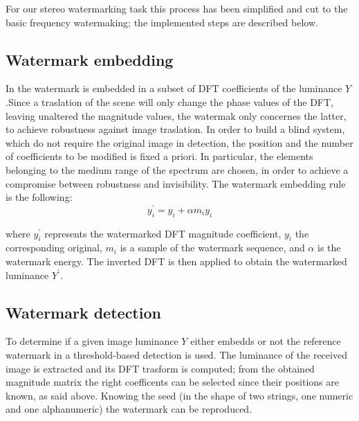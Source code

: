 For our stereo watermarking task this process has been simplified and cut to the basic frequency watermaking; the implemented steps are described below.

\subsection{Watermark embedding} 
\label{wat_emb}

In \cite{PIVA} the watermark is embedded in a subset of DFT coefficients of the luminance $Y$.\newline Since a traslation of the scene will only change the phase values of the DFT, leaving unaltered the magnitude values, the watermak only concernes the latter, to achieve robustness against image traslation.\newline
In order to build a blind system, which do not require the original image in detection, the position and the number of coefficients to be modified is fixed a priori. In particular, the elements belonging to the medium range of the
spectrum are chosen, in order to achieve a compromise between robustness and invisibility.
The watermark embedding rule is the following:
\begin{equation}\label{eq:wat}
y_{i}^{'} = y_{i}+\alpha m_{i}y_{i} 
\end{equation}

where $y_{i}^{'}$ represents the watermarked DFT magnitude coefficient, $y_{i}$ the corresponding original, $m_{i}$ is a sample of the watermark sequence, and $\alpha$ is the watermark energy.\newline
The inverted DFT is then applied to obtain the watermarked luminance $Y^{'}$.

\subsection{Watermark detection}

To determine if a given image luminance $Y$ either embedds or not the reference watermark in \cite{PIVA} a threshold-based detection is used.\newline
The luminance of the received image is extracted and its DFT trasform is computed; from the obtained magnitude matrix the right coefficents can be selected since their positions are known, as said above.\newline
Knowing the seed (in the shape of two strings, one numeric and one alphanumeric) the watermark can be reproduced.\newline

